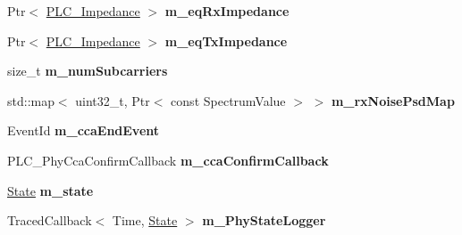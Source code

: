 \begin{DoxyCompactItemize}
\item 
\hypertarget{classns3_1_1PLC__HalfDuplexOfdmPhy_a9738f5edb93b5ae8b115fd8ccbfdc02b}{\-Ptr$<$ \hyperlink{classns3_1_1PLC__ValueBase}{\-P\-L\-C\-\_\-\-Impedance} $>$ {\bfseries m\-\_\-eq\-Rx\-Impedance}}\label{classns3_1_1PLC__HalfDuplexOfdmPhy_a9738f5edb93b5ae8b115fd8ccbfdc02b}

\item 
\hypertarget{classns3_1_1PLC__HalfDuplexOfdmPhy_afc47d34c0d11b856a3a9d47ca8acb607}{\-Ptr$<$ \hyperlink{classns3_1_1PLC__ValueBase}{\-P\-L\-C\-\_\-\-Impedance} $>$ {\bfseries m\-\_\-eq\-Tx\-Impedance}}\label{classns3_1_1PLC__HalfDuplexOfdmPhy_afc47d34c0d11b856a3a9d47ca8acb607}

\item 
\hypertarget{classns3_1_1PLC__HalfDuplexOfdmPhy_a21275e992aeaab6db7ff1d5f64642c89}{size\-\_\-t {\bfseries m\-\_\-num\-Subcarriers}}\label{classns3_1_1PLC__HalfDuplexOfdmPhy_a21275e992aeaab6db7ff1d5f64642c89}

\item 
\hypertarget{classns3_1_1PLC__HalfDuplexOfdmPhy_ad6f4ab3078f989d354c3d85acf345d07}{std\-::map$<$ uint32\-\_\-t, \-Ptr$<$ const \*
\-Spectrum\-Value $>$ $>$ {\bfseries m\-\_\-rx\-Noise\-Psd\-Map}}\label{classns3_1_1PLC__HalfDuplexOfdmPhy_ad6f4ab3078f989d354c3d85acf345d07}

\item 
\hypertarget{classns3_1_1PLC__HalfDuplexOfdmPhy_a665c5ac94fc11ce28a4e339a44210b00}{\-Event\-Id {\bfseries m\-\_\-cca\-End\-Event}}\label{classns3_1_1PLC__HalfDuplexOfdmPhy_a665c5ac94fc11ce28a4e339a44210b00}

\item 
\hypertarget{classns3_1_1PLC__HalfDuplexOfdmPhy_a97a8264fc6b8ecc64f171fd123fbaf45}{\-P\-L\-C\-\_\-\-Phy\-Cca\-Confirm\-Callback {\bfseries m\-\_\-cca\-Confirm\-Callback}}\label{classns3_1_1PLC__HalfDuplexOfdmPhy_a97a8264fc6b8ecc64f171fd123fbaf45}

\item 
\hypertarget{classns3_1_1PLC__HalfDuplexOfdmPhy_ae8b5e15753d4db61d3a9a064deb2312a}{\hyperlink{classns3_1_1PLC__HalfDuplexOfdmPhy_ae91e168f9a51bf5344e7e03d9ae13b60}{\-State} {\bfseries m\-\_\-state}}\label{classns3_1_1PLC__HalfDuplexOfdmPhy_ae8b5e15753d4db61d3a9a064deb2312a}

\item 
\hypertarget{classns3_1_1PLC__HalfDuplexOfdmPhy_adc6191b17189ec85356aba1b5f42cc93}{\-Traced\-Callback$<$ \-Time, \hyperlink{classns3_1_1PLC__HalfDuplexOfdmPhy_ae91e168f9a51bf5344e7e03d9ae13b60}{\-State} $>$ {\bfseries m\-\_\-\-Phy\-State\-Logger}}\label{classns3_1_1PLC__HalfDuplexOfdmPhy_adc6191b17189ec85356aba1b5f42cc93}

\end{DoxyCompactItemize}
